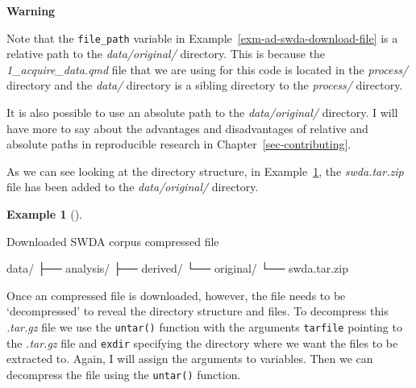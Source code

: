 \documentclass[
  letterpaper,
  DIV=11,
  numbers=noendperiod]{scrreprt}
\newenvironment{Shaded}{\begin{snugshade}}{\end{snugshade}}
\newcommand{\ExtensionTok}[1]{\textcolor[rgb]{0.00,0.00,0.00}{#1}}
\newcommand{\NormalTok}[1]{\textcolor[rgb]{0.00,0.00,0.00}{#1}}
\theoremstyle{definition}
\newtheorem{example}{Example}[chapter]
\theoremstyle{remark}
\begin{document}
\begin{tcolorbox}[enhanced jigsaw, leftrule=.75mm, colframe=quarto-callout-color-frame, colback=white, rightrule=.15mm, opacityback=0, arc=.35mm, breakable, bottomrule=.15mm, left=2mm, toprule=.15mm]

\textbf{ Warning}

Note that the \texttt{file\_path} variable in
Example~\ref{exm-ad-swda-download-file} is a relative path to the
\emph{data/original/} directory. This is because the
\emph{1\_acquire\_data.qmd} file that we are using for this code is
located in the \emph{process/} directory and the \emph{data/} directory
is a sibling directory to the \emph{process/} directory.

It is also possible to use an absolute path to the \emph{data/original/}
directory. I will have more to say about the advantages and
disadvantages of relative and absolute paths in reproducible research in
Chapter~\ref{sec-contributing}.

\end{tcolorbox}

As we can see looking at the directory structure, in
Example~\ref{exm-ad-swda-download-location}, the \emph{swda.tar.zip}
file has been added to the \emph{data/original/} directory.

\begin{example}[]\protect\hypertarget{exm-ad-swda-download-location}{}\label{exm-ad-swda-download-location}

Downloaded SWDA corpus compressed file

\begin{Shaded}
\begin{Highlighting}[]
\ExtensionTok{data/}
\ExtensionTok{├──}\NormalTok{ analysis/}
\ExtensionTok{├──}\NormalTok{ derived/}
\ExtensionTok{└──}\NormalTok{ original/}
    \ExtensionTok{└──}\NormalTok{ swda.tar.zip}
\end{Highlighting}
\end{Shaded}

\end{example}

Once an compressed file is downloaded, however, the file needs to be
`decompressed' to reveal the directory structure and files. To
decompress this \emph{.tar.gz} file we use the \texttt{untar()} function
with the arguments \texttt{tarfile} pointing to the \emph{.tar.gz} file
and \texttt{exdir} specifying the directory where we want the files to
be extracted to. Again, I will assign the arguments to variables. Then
we can decompress the file using the \texttt{untar()} function.
\end{document}
